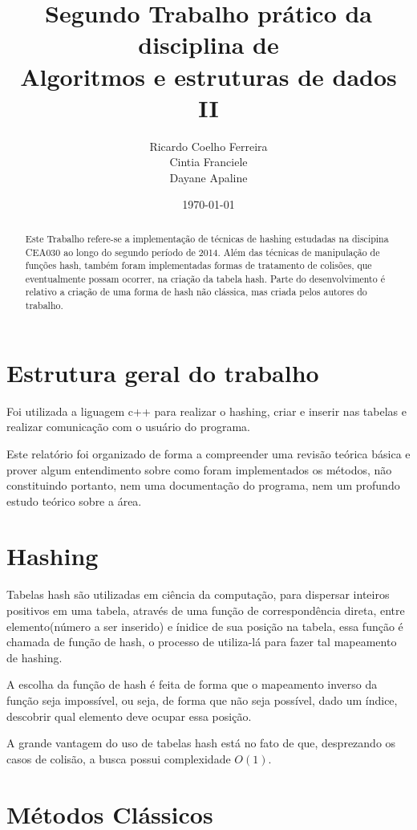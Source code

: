 \documentclass[a4paper]{report}
\title{Segundo Trabalho prático da disciplina de \\  Algoritmos e estruturas de dados II}
\author{Ricardo Coelho Ferreira \\ Cintia Franciele \\ Dayane Apaline}
\date{\today}
\begin{document}
\maketitle

\begin{abstract}

Este Trabalho refere-se a implementação de técnicas de hashing  estudadas na discipina CEA030 ao longo do segundo período de 2014. Além das técnicas de manipulação de funções hash, também foram implementadas formas de  tratamento de colisões, que eventualmente possam ocorrer, na criação da tabela hash. Parte do desenvolvimento é relativo a criação de uma forma de hash não clássica, mas criada pelos autores do trabalho. 

\end{abstract}

\section{Estrutura geral  do  trabalho}

Foi utilizada a liguagem c++ para realizar o hashing, criar e inserir nas tabelas e realizar comunicação com o usuário do programa.

Este relatório foi organizado de forma a compreender uma revisão teórica básica e prover algum entendimento sobre como foram  implementados os métodos, não constituindo portanto, nem uma documentação  do programa, nem um profundo estudo teórico sobre a área.

\section{Hashing}
Tabelas hash são utilizadas em ciência da computação, para dispersar inteiros positivos em uma tabela, através de uma função de correspondência direta, entre elemento(número a ser inserido) e ínidice de sua posição na tabela, essa função é chamada de função de hash, o processo de utiliza-lá para fazer tal mapeamento de hashing.

A escolha da função de hash é feita de forma que o mapeamento inverso da função seja impossível, ou seja, de forma que não seja possível, dado um índice, descobrir qual elemento deve ocupar essa posição.

A grande vantagem do uso de tabelas hash está no fato de que, desprezando os casos de colisão, a busca possui complexidade \large$O(1)$.\normalsize


\section{Métodos Clássicos}
\end{document}
